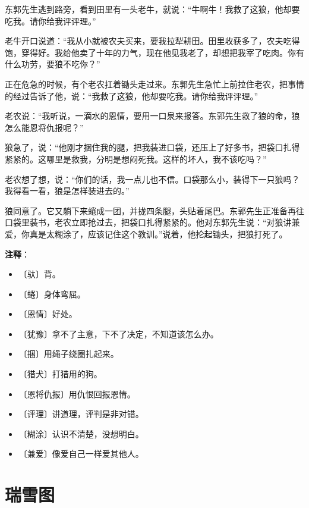 \documentclass[12pt,UTF-8,openany]{ctexbook}
\begin{document}
\begin{large}
    东郭先生逃到路旁，看到田里有一头老牛，就说：“牛啊牛！我救了这狼，他却要吃我。请你给我评评理。”
    
    老牛开口说道：“我从小就被农夫买来，要我拉犁耕田。田里收获多了，农夫吃得饱，穿得好。我给他卖了十年的力气，现在他见我老了，却想把我宰了吃肉。你有什么功劳，要狼不吃你？”
    
    正在危急的时候，有个老农扛着锄头走过来。东郭先生急忙上前拉住老农，把事情的经过告诉了他，说：“我救了这狼，他却要吃我。请你给我评评理。”
    
    老农说：“我听说，一滴水的恩情，要用一口泉来报答。东郭先生救了狼的命，狼怎么能恩将仇报呢？”
    
    狼急了，说：“他刚才捆住我的腿，把我装进口袋，还压上了好多书，把袋口扎得紧紧的。这哪里是救我，分明是想闷死我。这样的坏人，我不该吃吗？”
    
    老农想了想，说：“你们的话，我一点儿也不信。口袋那么小，装得下一只狼吗？我得看一看，狼是怎样装进去的。”
    
    狼同意了。它又躺下来蜷成一团，并拢四条腿，头贴着尾巴。东郭先生正准备再往口袋里装书，老农立即抢过去，把袋口扎得紧紧的。他对东郭先生说：“对狼讲兼爱，你真是太糊涂了，应该记住这个教训。”说着，他抡起锄头，把狼打死了。
    
\end{large}


\newpage

\textbf{注释}：

\vspace{-1em}

\begin{itemize}
    \setlength\itemsep{-0.2em}
    \item 〔驮〕背。
    \item 〔蜷〕身体弯屈。
    \item 〔恩情〕好处。
    \item 〔犹豫〕拿不了主意，下不了决定，不知道该怎么办。
    \item 〔捆〕用绳子绕圈扎起来。
    \item 〔猎犬〕打猎用的狗。
    \item 〔恩将仇报〕用仇恨回报恩情。
    \item 〔评理〕讲道理，评判是非对错。
    \item 〔糊涂〕认识不清楚，没想明白。
    \item 〔兼爱〕像爱自己一样爱其他人。
\end{itemize}

\chapter{瑞雪图}
\end{document}
